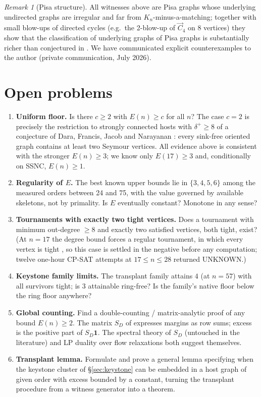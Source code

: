 \documentclass[11pt]{amsart}
\theoremstyle{remark}
\newtheorem{remark}[theorem]{Remark}
\begin{document}
\begin{remark}[Pisa structure]
All witnesses above are Pisa graphs whose underlying undirected graphs are
irregular and far from $K_n$-minus-a-matching; together with small blow-ups
of directed cycles (e.g.\ the 2-blow-up of $\vec{C}_4$ on 8 vertices) they
show that the classification of underlying graphs of Pisa graphs is
substantially richer than conjectured in \cite[Conj.~5.1]{Halkiewicz2026}.
We have communicated explicit counterexamples to the author (private
communication, July 2026).
\end{remark}

\section{Open problems}\label{sec:open}

\begin{enumerate}
\item \textbf{Uniform floor.} Is there $c \ge 2$ with $E(n) \ge c$ for all
  $n$? The case $c = 2$ is precisely the restriction to strongly connected
  hosts with $\delta^+ \ge 8$ of a conjecture of Dara, Francis, Jacob and
  Narayanan \cite{DaraFrancisJacobNarayanan2022}: every sink-free oriented
  graph contains at least two Seymour vertices. All evidence above is
  consistent with the stronger $E(n) \ge 3$; we know only $E(17) \ge 3$
  and, conditionally on SSNC, $E(n) \ge 1$.
\item \textbf{Regularity of $E$.} The best known upper bounds lie in
  $\{3,4,5,6\}$ among the measured orders between 24 and 75,
  with the value governed by available skeletons, not by primality. Is $E$
  eventually constant? Monotone in any sense?
\item \textbf{Tournaments with exactly two tight vertices.} Does a
  tournament with minimum out-degree $\ge 8$ and exactly two satisfied
  vertices, both tight, exist? (At $n = 17$ the degree bound forces a
  regular tournament, in which every vertex is tight
  \cite[Lem.~2.2]{GuoKangZwaneveld2026}, so this case is settled in the
  negative before any computation; twelve one-hour CP-SAT attempts at
  $17 \le n \le 28$ returned UNKNOWN.)
\item \textbf{Keystone family limits.} The transplant family attains $4$
  (at $n=57$) with all survivors tight; is $3$ attainable ring-free? Is the
  family's native floor below the ring floor anywhere?
\item \textbf{Global counting.} Find a double-counting / matrix-analytic
  proof of any bound $E(n) \ge 2$. The matrix $S_D$ of
  \cite{GuoKangZwaneveld2026} expresses margins as row sums; excess is the
  positive part of $S_D \mathbf{1}$. The spectral theory of $S_D$ (untouched
  in the literature) and LP duality over flow relaxations both suggest
  themselves.
\item \label{prob:transplant}\textbf{Transplant lemma.} Formulate and prove a general lemma
  specifying when the keystone cluster of \S\ref{sec:keystone} can be
  embedded in a host graph of given order with excess bounded by a
  constant, turning the transplant procedure from a witness generator into
  a theorem.
\end{enumerate}
\end{document}

